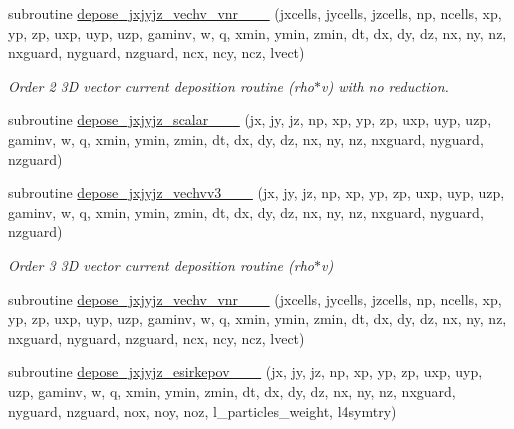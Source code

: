 \begin{DoxyCompactItemize}
subroutine \hyperlink{current__deposition_8_f90_a110bf577b181354401374e000770acbf}{depose\+\_\+jxjyjz\+\_\+vechv\+\_\+vnr\+\_\+\_\+\_} (jxcells, jycells, jzcells, np, ncells, xp, yp, zp,                                   uxp, uyp, uzp, gaminv, w, q, xmin, ymin, zmin,                                       dt, dx, dy, dz, nx, ny, nz, nxguard, nyguard, nzguard, ncx, ncy, ncz, lvect)
\begin{DoxyCompactList}\small\item\em Order 2 3D vector current deposition routine (rho$\ast$v) with no reduction. \end{DoxyCompactList}\item 
subroutine \hyperlink{current__deposition_8_f90_a9b0dd01b38cde503f1aac44bb2bd1ca8}{depose\+\_\+jxjyjz\+\_\+scalar\+\_\+\_\+\_} (jx, jy, jz, np, xp, yp, zp, uxp, uyp, uzp, gaminv, w, q, xmin, ymin, zmin,                                       dt, dx, dy, dz, nx, ny, nz, nxguard, nyguard, nzguard)
\item 
subroutine \hyperlink{current__deposition_8_f90_a4b4bb06ef5eb6ca6e28d2c24472fb216}{depose\+\_\+jxjyjz\+\_\+vechvv3\+\_\+\_\+\_} (jx, jy, jz, np, xp, yp, zp, uxp, uyp, uzp, gaminv, w, q, xmin, ymin, zmin,                                       dt, dx, dy, dz, nx, ny, nz, nxguard, nyguard, nzguard)
\begin{DoxyCompactList}\small\item\em Order 3 3D vector current deposition routine (rho$\ast$v) \end{DoxyCompactList}\item 
subroutine \hyperlink{current__deposition_8_f90_a95bde392441e1836c282cd5b53c6e5c1}{depose\+\_\+jxjyjz\+\_\+vechv\+\_\+vnr\+\_\+\_\+\_} (jxcells, jycells, jzcells, np, ncells, xp, yp, zp,                                   uxp, uyp, uzp, gaminv, w, q, xmin, ymin, zmin,                                       dt, dx, dy, dz, nx, ny, nz, nxguard, nyguard, nzguard, ncx, ncy, ncz, lvect)
\item 
subroutine \hyperlink{current__deposition_8_f90_ad43ded0ebf597e9d3cb47ff84ec04413}{depose\+\_\+jxjyjz\+\_\+esirkepov\+\_\+\_\+\_} (jx, jy, jz, np, xp, yp, zp, uxp, uyp, uzp, gaminv, w, q, xmin, ymin, zmin,                                                                                                                                                   dt, dx, dy, dz, nx, ny, nz, nxguard, nyguard, nzguard,                                                                                                                                                   nox, noy, noz, l\+\_\+particles\+\_\+weight, l4symtry)

\end{DoxyCompactItemize}
